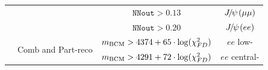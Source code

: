 \begin{table}[t!]
\begin{center}
\begin{footnotesize}
\begin{tabular}{c|c|c|c}
\cline{3-4}
	& 					& $\texttt{NNout} > 0.13$ & $\jpsi(\mu\mu)$ \\
	&					& $\texttt{NNout} > 0.20$ & $\jpsi(ee)$\\
\cline{2-4}
	& \multirow{2}{*}{Comb and Part-reco}	& $m_{\rm BCM} > 4374 + 65 \cdot \log(\chi^2_{FD})$ & $ee$ low- \\
	&							& $m_{\rm BCM} > 4291 + 72 \cdot \log(\chi^2_{FD})$ & $ee$ central- \\
\hline
\end{tabular}
\end{footnotesize}
\end{center}
\end{table}


